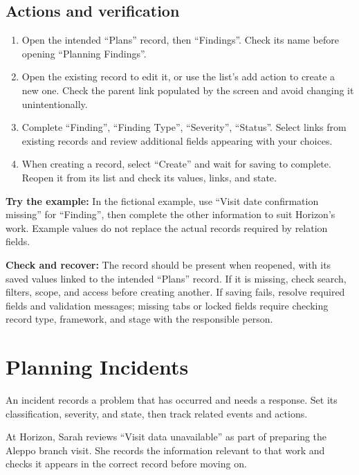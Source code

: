 \subsection{Actions and verification}
\begin{enumerate}
\item Open the intended “Plans” record, then “Findings”. Check its name before opening “Planning Findings”.
\item Open the existing record to edit it, or use the list's add action to create a new one. Check the parent link populated by the screen and avoid changing it unintentionally.
\item Complete “Finding”, “Finding Type”, “Severity”, “Status”. Select links from existing records and review additional fields appearing with your choices.
\item When creating a record, select “Create” and wait for saving to complete. Reopen it from its list and check its values, links, and state.
\end{enumerate}

\textbf{Try the example:} In the fictional example, use “Visit date confirmation missing” for “Finding”, then complete the other information to suit Horizon's work. Example values do not replace the actual records required by relation fields.

\textbf{Check and recover:} The record should be present when reopened, with its saved values linked to the intended “Plans” record. If it is missing, check search, filters, scope, and access before creating another. If saving fails, resolve required fields and validation messages; missing tabs or locked fields require checking record type, framework, and stage with the responsible person.

\clearpage
\section{Planning Incidents}
\label{sec:projects-feature-planning-incidents}

An incident records a problem that has occurred and needs a response. Set its classification, severity, and state, then track related events and actions.

\begin{rcnote}
At Horizon, Sarah reviews “Visit data unavailable” as part of preparing the Aleppo branch visit. She records the information relevant to that work and checks it appears in the correct record before moving on.
\end{rcnote}

